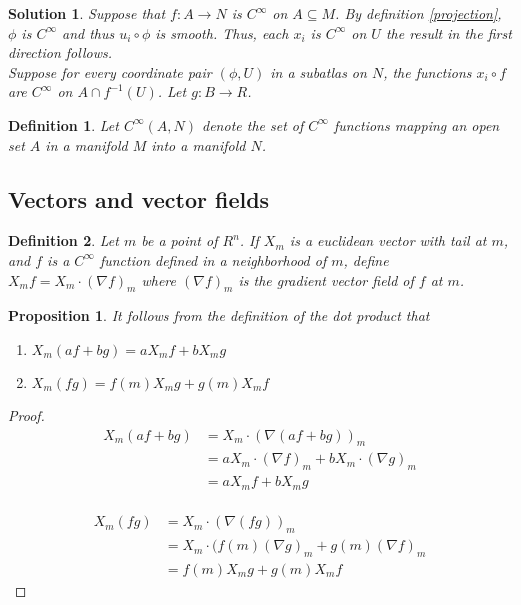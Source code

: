 \documentclass{article}
\theoremstyle{problemstyle}
\theoremstyle{problemstyle}
\newtheorem{solution}{Solution}
\theoremstyle{problemstyle}
\newtheorem{definition}{Definition}
\theoremstyle{problemstyle}
\newtheorem{proposition}{Proposition}
\theoremstyle{problemstyle}
\theoremstyle{problemstyle}
\begin{document}
\begin{solution}
Suppose that $f:A \rightarrow N$ is $C^\infty$ on $A \subseteq M$. By definition \ref{projection}, $\phi$ is $C^\infty$ and thus $u_i \circ \phi$ is smooth. Thus, each $x_i$ is $C^\infty$ on $U$ the result in the first direction follows. \\

Suppose for every coordinate pair $(\phi,U)$ in a subatlas on $N$, the functions $x_i \circ f$ are $C^\infty$ on $A \cap f^{-1}(U)$. Let $g:B \rightarrow R$. 
\end{solution}

\begin{definition}
Let $C^\infty(A,N)$ denote the set of $C^\infty$ functions mapping an open set $A$ in a manifold $M$ into a manifold $N$. 
\end{definition}

\subsection{Vectors and vector fields}

\begin{definition}
Let $m$ be a point of $R^n$. If $X_m$ is a euclidean vector with tail at $m$, and $f$ is a $C^\infty$ function defined in a neighborhood of $m$, define $X_mf = X_m \cdot (\nabla f)_m$ where $(\nabla f)_m$ is the gradient vector field of $f$ at $m$. 
\end{definition}

\begin{proposition}
It follows from the definition of the dot product that 
\begin{enumerate}
\item $X_m(af+bg) = aX_mf+bX_mg$
\item $X_m(fg) = f(m)X_mg+g(m)X_mf$
\end{enumerate}
\end{proposition}

\begin{proof}
\begin{align*}
X_m(af+bg) &= X_m \cdot (\nabla (af+bg))_m\\
 &=aX_m \cdot (\nabla f)_m+bX_m \cdot (\nabla g)_m \\
 &= aX_mf+bX_mg
\end{align*}\\

\begin{align*}
X_m(fg) &= X_m \cdot (\nabla (fg))_m\\
 &= X_m \cdot (f(m)(\nabla g)_m+g(m)(\nabla f)_m \\
 &= f(m)X_mg+g(m)X_mf
\end{align*}
\end{proof}



\newpage
\end{document}
